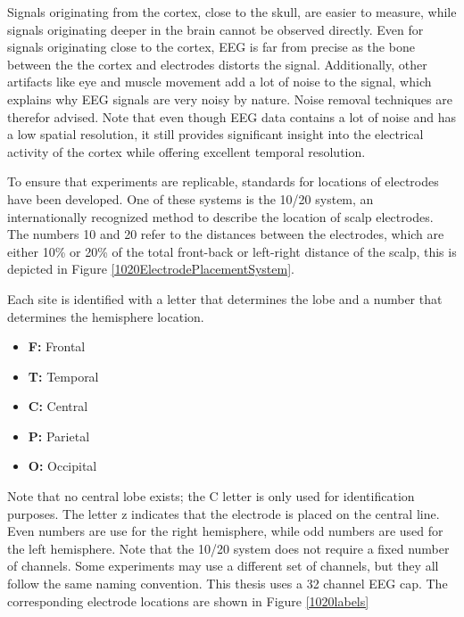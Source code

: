 
Signals originating from the cortex, close to the skull, are easier to measure, while signals originating deeper in the brain cannot be observed directly. Even for signals originating close to the cortex, EEG is far from precise as the bone between the the cortex and electrodes distorts the signal. Additionally, other artifacts like eye and muscle movement add a lot of noise to the signal, which explains why EEG signals are very noisy by nature. Noise removal techniques are therefor advised\citep{noiseRem}. Note that even though EEG data contains a lot of noise and has a low spatial resolution, it still provides significant insight into the electrical activity of the cortex while offering excellent temporal resolution\cite{GivenPaper}.

\npar

To ensure that experiments are replicable, standards for locations of electrodes have been developed. One of these systems is the 10/20 system, an internationally recognized method to describe the location of scalp electrodes\cite{TenTwentyManual}. The numbers 10 and 20 refer to the distances between the electrodes, which are either 10\% or 20\% of the total front-back or left-right distance of the scalp, this is depicted in Figure \ref{1020ElectrodePlacementSystem}. 


Each site is identified with a letter that determines the lobe and a number that determines the hemisphere location.
\begin{itemize}
\item \textbf{F:} Frontal
\item \textbf{T:} Temporal
\item \textbf{C:} Central
\item \textbf{P:} Parietal
\item \textbf{O:} Occipital
\end{itemize}
Note that no central lobe exists; the C letter is only used for identification purposes. The letter z indicates that the electrode is placed on the central line. Even numbers are use for the right hemisphere, while odd numbers are used for the left hemisphere. Note that the 10/20 system does not require a fixed number of channels. Some experiments may use a different set of channels, but they all follow the same naming convention. This thesis uses a 32 channel EEG cap. The corresponding electrode locations are shown in Figure \ref{1020labels}

